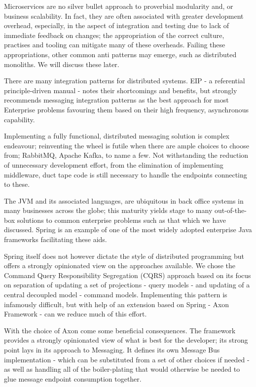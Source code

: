 Microservices are no silver bullet approach to proverbial modularity and, or business scalability. In fact, they are often associated with greater development overhead, especially, in the aspect of integration and testing due to lack of immediate feedback on changes; the appropriation of the correct culture, practises and tooling can mitigate many of these overheads. Failing these appropriations, other common anti patterns may emerge, such as distributed monoliths. We will discuss these later.

There are many integration patterns for distributed systems. EIP - a referential principle-driven manual - notes their shortcomings and benefits, but strongly recommends messaging integration patterns as the best approach for most Enterprise problems favouring them based on their high frequency, asynchronous capability.

Implementing a fully functional, distributed messaging solution is complex endeavour; reinventing the wheel is futile when there are ample choices to choose from; RabbitMQ, Apache Kafka, to name a few. Not withstanding the reduction of unnecessary development effort, from the elimination of implementing middleware, duct tape code is still necessary to handle the endpoints connecting to these.

The JVM and its associated languages, are ubiquitous in back office systems in many businesses across the globe; this maturity yields stage to many out-of-the-box solutions to common enterprise problems such as that which we have discussed. Spring is an example of one of the most widely adopted enterprise Java frameworks facilitating these aids.

Spring itself does not however dictate the style of distributed programming but offers a strongly opinionated view on the approaches available. We chose the Command Query Responsibility Segregation (CQRS) approach based on its focus on separation of updating a set of projections - query models - and updating of a central decoupled model - command models. Implementing this pattern is infamously difficult, but with help of an extension based on Spring - Axon Framework - can we reduce much of this effort.  

With the choice of Axon come some beneficial consequences. The framework provides a strongly opinionated view of what is best for the developer; its strong point lays in its approach to Messaging. It defines its own Message Bus implementation - which can be substituted from a set of other choices if needed - as well as handling all of the boiler-plating that would otherwise be needed to glue message endpoint consumption together.

